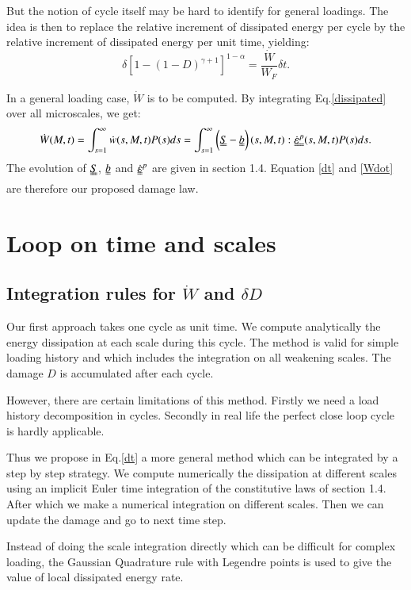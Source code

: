 \documentclass[3p,times,number,review]{elsarticle}
\begin{document}
But the notion of cycle itself may be hard to identify for general loadings. The idea is then to replace the relative increment of dissipated energy per cycle by the relative increment of dissipated energy per unit time, yielding:
\begin{equation}
\delta [1-(1-D)^{\gamma+1}]^{1-\alpha}=\dfrac{\dot{W}}{W_F}\delta t.
\label{dt}
\end{equation}

In a general loading case, $\dot{W}$ is to be computed. By integrating Eq.\eqref{dissipated} over all microscales, we get:
\begin{equation}\dot{W}(M,t)=\int_{s=1}^{\infty}\dot{w}(s,M,t)P(s)ds=\int_{s=1}^{\infty}\left(\uuline{S}-\uuline{b} \right) (s,M,t):\uuline{\dot{\varepsilon}^p}(s,M,t)P(s)ds.\label{Wdot}
\end{equation}
The evolution of $\uuline{S}$, $\uuline{b}$ and $\uuline{\dot{\varepsilon}}^p$ are given in section 1.4. Equation \eqref{dt} and \eqref{Wdot} are therefore our proposed damage law.

\section{Loop on time and scales}
\subsection{Integration rules for $\dot{W}$ and $\delta D$}
Our first approach takes one cycle as unit time. We compute analytically the energy dissipation at each scale during this cycle. The method is valid for simple loading history and which includes the integration on all weakening scales. The damage $D$ is accumulated after each cycle.

However, there are certain limitations of this method. Firstly we need a load history decomposition in cycles. Secondly in real life the perfect close loop cycle is hardly applicable.

Thus we propose in Eq.\eqref{dt} a more general method which can be integrated by a step by step strategy. We compute numerically the dissipation at different scales using an implicit Euler time integration of the constitutive laws of section 1.4. After which we make a numerical integration on different scales. Then we can update the damage and go to next time step. 

Instead of doing the scale integration directly which can be difficult for complex loading, the Gaussian Quadrature rule with Legendre points is used to give the value of local dissipated energy rate.
\end{document}
